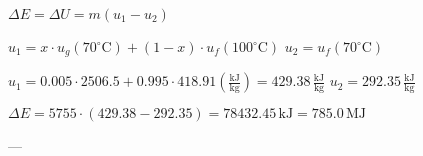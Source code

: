 \( \Delta E = \Delta U = m (u_1 - u_2) \)  

\( u_1 = x \cdot u_g (70^\circ \text{C}) + (1 - x) \cdot u_f (100^\circ \text{C}) \)  
\( u_2 = u_f (70^\circ \text{C}) \)  

\( u_1 = 0.005 \cdot 2506.5 + 0.995 \cdot 418.91 \left( \frac{\text{kJ}}{\text{kg}} \right) = 429.38 \, \frac{\text{kJ}}{\text{kg}} \)  
\( u_2 = 292.35 \, \frac{\text{kJ}}{\text{kg}} \)  

\( \Delta E = 5755 \cdot (429.38 - 292.35) = 78432.45 \, \text{kJ} = 785.0 \, \text{MJ} \)  

---